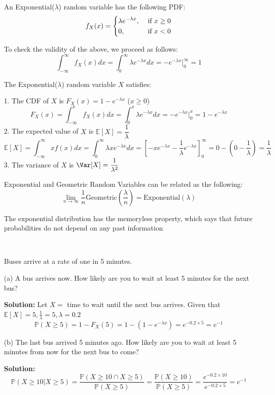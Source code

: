 \begin{definition}
    An Exponential(\(\lambda\)) random variable has the following PDF: 
    \[
        f_X(x) = \begin{dcases}
            \lambda e^{-\lambda x} , &\text{ if }  x \geq 0\\
            0 , &\text{ if } x < 0
        \end{dcases}
    \]
\end{definition}

To check the validity of the above, we proceed as follows:
\[
    \int_{-\infty}^{\infty} f_X(x)dx = \int_0^{\infty} \lambda e^{-\lambda x} dx = -e^{-\lambda x} \Big|_0^{\infty} = 1
\]

The Exponential(\(\lambda\)) random variable \(X\) satisfies:

1. The CDF of \(X\) is \(F_X(x) = 1 - e^{-\lambda x}\) (\(x \geq 0\))
\[
    F_X(x) = \int_{-\infty}^x f_X(x) dx = \int_{0}^x \lambda e^{-\lambda x} dx = -e^{-\lambda x} \Big|_0^x = 1 - e^{- \lambda x}
\]
2. The expected value of \(X\) is \(\mathbb{E}[X] = \dfrac{1}{\lambda}\)
\[
\mathbb{E}[X] = \int_{-\infty }^{\infty} xf(x) dx = \int_{0}^{\infty} \lambda x e^{-\lambda x} dx = \left[-xe^{-\lambda x} - \dfrac{1}{\lambda }e^{-\lambda x}\right]_0^{\infty} = 0 - (0 -\dfrac{1}{\lambda }) = \dfrac{1}{\lambda}
\]
3. The variance of \(X\) is \(\Var[X] = \dfrac{1}{\lambda^2}\) 

Exponential and Geometric Random Variables can be related as the following:
\[
    \lim_{n \to \infty} \dfrac{1}{n} \text{Geometric}(\dfrac{\lambda}{n}) = \text{Exponential}(\lambda) 
\]

The exponential distribution has the memoryless property, which says that future probabilities do not depend on any past information

\begin{eg}~ 

    Buses arrive at a rate of one in 5 minutes. 

    (a) A bus arrives now. How likely are you to wait at least 5 minutes for the next bus?

    \textbf{Solution:} 
    Let \(X = \) time to wait until the next bus arrives. Given that \(\mathbb{E}[X] = 5, \frac{1}{\lambda} = 5, \lambda = 0.2\) 
    \[
        \mathbb{P}(X \geq 5) = 1 - F_X(5) = 1 - (1 - e^{-\lambda x}) = e^{-0.2 \times 5} = e^{-1}
    \]

    (b) The last bus arrived 5 minutes ago. How likely are you to wait at least 5 minutes from now for the next bus to come?

    \textbf{Solution:} 
    \[
        \mathbb{P}(X \geq 10 \vert X \geq 5) = \dfrac{\mathbb{P}(X \geq 10 \cap X \geq 5)}{\mathbb{P}(X \geq 5)} = \dfrac{\mathbb{P}(X \geq 10)}{\mathbb{P}(X \geq 5)} = \dfrac{e^{-0.2 \times 10}}{e^{-0.2 \times 5}} = e^{-1}
    \]
\end{eg}

